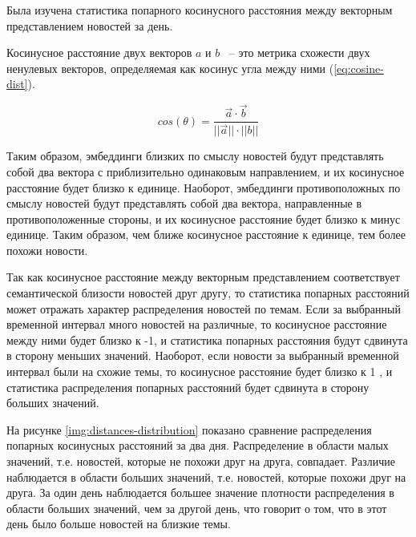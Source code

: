 Была изучена статистика попарного косинусного расстояния между векторным представлением новостей за день.

Косинусное расстояние двух векторов $a$ и $b$ ~-- это метрика схожести двух ненулевых векторов, определяемая как косинус угла между ними (\ref{eq:cosine-dist}).

\begin{equation}
    cos(\theta) = \frac{\vec{a} \cdot \vec{b}}{||\vec{a}|| \cdot ||{b}||}
    \label{eq:cosine-dist}
\end{equation}

Таким образом, эмбеддинги близких по смыслу новостей будут представлять собой два вектора с приблизительно одинаковым направлением, и их косинусное расстояние будет близко к единице. Наоборот, эмбеддинги противоположных по смыслу новостей будут представлять собой два вектора, направленные в противоположенные стороны, и их косинусное расстояние будет близко к минус единице. Таким образом, чем ближе косинусное расстояние к единице, тем более похожи новости.

Так как косинусное расстояние между векторным представлением соответствует семантической близости новостей друг другу, то статистика попарных расстояний может отражать характер распределения новостей по темам. Если за выбранный временной интервал много новостей на различные, то косинусное расстояние между ними будет близко к -1, и статистика попарных расстояния будут сдвинута в сторону меньших значений. Наоборот, если новости за выбранный временной интервал были на схожие темы, то косинусное расстояние будет близко к 1 , и статистика распределения попарных расстояний будет сдвинута в сторону больших значений.

На рисунке \ref{img:distances-distribution} показано сравнение распределения попарных косинусных расстояний за два дня. Распределение в области малых значений, т.е. новостей, которые не похожи друг на друга, совпадает. Различие наблюдается в области больших значений, т.е. новостей, которые похожи друг на друга. За один день наблюдается большее значение плотности распределения в области больших значений, чем за другой день, что говорит о том, что в этот день было больше новостей на близкие темы.

